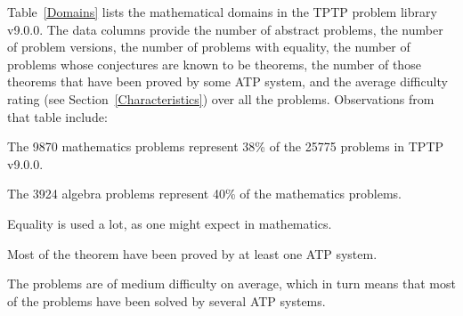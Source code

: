 \documentclass[runningheads]{llncs}
\newenvironment{packed_itemize}{
\vspace*{-0.2em}
\begin{itemize}
\setlength{\partopsep}{0pt}
\setlength{\itemsep}{1pt}
\setlength{\parskip}{0pt}
\setlength{\parsep}{0pt}
}{\end{itemize}}
\begin{document}
Table~\ref{Domains} lists the mathematical domains in the TPTP problem library v9.0.0.
The data columns provide the number of abstract problems, the number of problem versions, the
number of problems with equality, the number of problems whose conjectures are known to be
theorems, the number of those theorems that have been proved by some ATP system, and the average 
difficulty rating (see Section~\ref{Characteristics}) over all the problems.
Observations from that table include:
\begin{packed_itemize}
\item The 9870 mathematics problems represent 38\% of the 25775 problems in TPTP v9.0.0.
\item The 3924 algebra problems represent 40\% of the mathematics problems.
\item Equality is used a lot, as one might expect in mathematics.
\item Most of the theorem have been proved by at least one ATP system.
\item The problems are of medium difficulty on average, which in turn means that most of the 
      problems have been solved by several ATP systems.
\end{packed_itemize}

\end{document}
